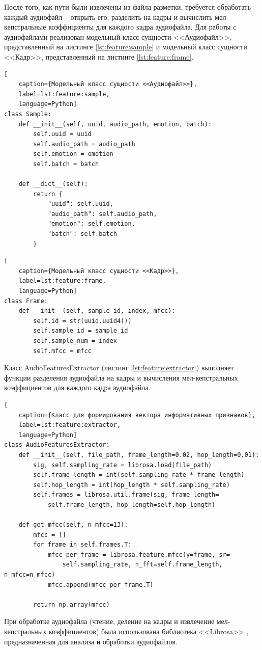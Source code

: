 После того, как пути были извлечены из файла разметки, требуется обработать каждый аудиофайл -- открыть его, разделить на кадры и вычислить мел-кепстральные коэффициенты для каждого кадра аудиофайла. Для работы с аудиофайлами реализован модельный класс сущности <<Аудиофайл>>, представленный на листинге \ref{lst:feature:sample} и модельный класс сущности <<Кадр>>, представленный на листинге \ref{lst:feature:frame}.
\begin{lstlisting}[
	caption={Модельный класс сущности <<Аудиофайл>>},
	label=lst:feature:sample,
	language=Python]
class Sample:
    def __init__(self, uuid, audio_path, emotion, batch):
        self.uuid = uuid
        self.audio_path = audio_path
        self.emotion = emotion
        self.batch = batch

    def __dict__(self):
        return {
            "uuid": self.uuid,
            "audio_path": self.audio_path,
            "emotion": self.emotion,
            "batch": self.batch
        }
\end{lstlisting}

\begin{lstlisting}[
	caption={Модельный класс сущности <<Кадр>>},
	label=lst:feature:frame,
	language=Python]
class Frame:
    def __init__(self, sample_id, index, mfcc):
        self.id = str(uuid.uuid4())
        self.sample_id = sample_id
        self.sample_num = index
        self.mfcc = mfcc
\end{lstlisting}

Класс AudioFeaturesExtractor (листинг \ref{lst:feature:extractor}) выполняет функции разделения аудиофайла на кадры и вычисления мел-кепстральных коэффициентов для каждого кадра аудиофайла.
\begin{lstlisting}[
	caption={Класс для формирования вектора информативных признаков},
	label=lst:feature:extractor,
	language=Python]
class AudioFeaturesExtractor:
    def __init__(self, file_path, frame_length=0.02, hop_length=0.01):
        sig, self.sampling_rate = librosa.load(file_path)
        self.frame_length = int(self.sampling_rate * frame_length) 
        self.hop_length = int(hop_length * self.sampling_rate)     
        self.frames = librosa.util.frame(sig, frame_length=
			self.frame_length, hop_length=self.hop_length)

    def get_mfcc(self, n_mfcc=13):
        mfcc = []
        for frame in self.frames.T:
            mfcc_per_frame = librosa.feature.mfcc(y=frame, sr=
				self.sampling_rate, n_fft=self.frame_length, n_mfcc=n_mfcc)
            mfcc.append(mfcc_per_frame.T)

        return np.array(mfcc)
\end{lstlisting}
При обработке аудиофайла (чтение, деление на кадры и извлечение мел-кепстральных коэффициентов) была использована библиотека <<Librosa>> \cite{librosa}, предназначенная для анализа и обработки аудиофайлов. 

